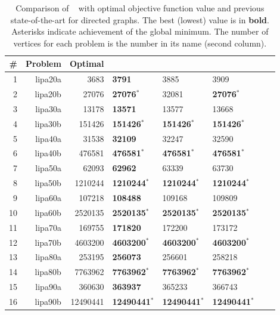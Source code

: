 \documentclass[preprint,11pt]{elsarticle}
\begin{document}
\begin{table}[h!]
\caption{Comparison of \FAQ~ with optimal objective function value and previous state-of-the-art for directed graphs.  The best (lowest) value is in \textbf{bold}. Asterisks indicate achievement of the global minimum.  The number of vertices for each problem is the number in its name (second column).}
\begin{center}
\begin{tabular}{|r|r|r||l|l|l|l|l|}
	\hline 
	          \# &  Problem &      Optimal & \FAQ~ & \Epath~& \Grad~ \\
	\hline 
	           1 &  lipa20a &     3683 & \textbf{3791} &     3885 &     3909 \\ 
	           2 &  lipa20b &    27076 & \textbf{27076}$^*$ &    32081 &    \textbf{27076}$^*$ \\ 
	           3 &  lipa30a &    13178 & \textbf{13571} 	&    13577 &    13668 \\ 
	           4 &  lipa30b &   151426 & \textbf{151426}$^*$ & \textbf{151426}$^*$ &   \textbf{151426}$^*$ \\ 
	           5 &  lipa40a &    31538 & \textbf{32109} 	&    32247 &    32590 \\ 
	           6 &  lipa40b &   476581 & \textbf{476581}$^*$ &   \textbf{476581}$^*$ &   \textbf{476581}$^*$ \\ 
	           7 &  lipa50a &    62093 & \textbf{62962} &    63339 &    63730 \\ 
	           8 &  lipa50b &  1210244 & \textbf{1210244}$^*$ &  \textbf{1210244}$^*$ &  \textbf{1210244}$^*$ \\ 
	           9 &  lipa60a &   107218 & \textbf{108488} &   109168 &   109809 \\ 
	          10 &  lipa60b &  2520135 & \textbf{2520135}$^*$ &  \textbf{2520135}$^*$ &  \textbf{2520135}$^*$ \\ 
	          11 &  lipa70a &   169755 & \textbf{171820} &   172200 &   173172 \\ 
	          12 &  lipa70b &  4603200 & \textbf{4603200}$^*$ &  \textbf{4603200}$^*$ &  \textbf{4603200}$^*$ \\ 
	          13 &  lipa80a &   253195 & \textbf{256073} &   256601 &   258218 \\ 
	          14 &  lipa80b &  7763962 & \textbf{7763962}$^*$ &  \textbf{7763962}$^*$ &  \textbf{7763962}$^*$ \\ 
	          15 &  lipa90a &   360630 & \textbf{363937} &   365233 &   366743 \\ 
	          16 &  lipa90b & 12490441 & \textbf{12490441}$^*$ & \textbf{12490441}$^*$ & \textbf{12490441}$^*$ \\ 
	\hline
	\end{tabular}
\end{center}
\label{tab:directed}
\end{table}%
\end{document}
